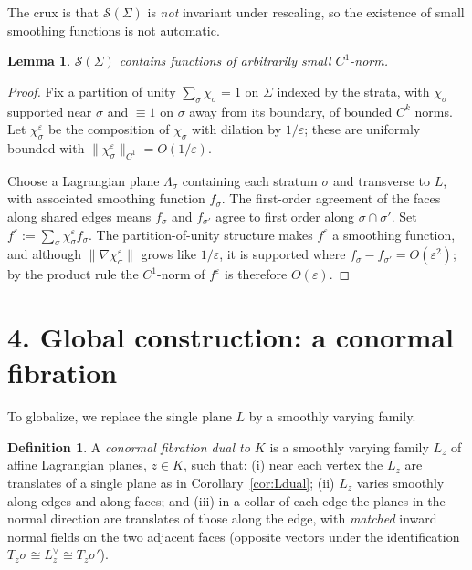 \documentclass[11pt]{article}
\newcommand{\Sm}{\mathscr S}
\newcommand{\Ldual}{L^{\vee}}
\newtheorem{lemma}{Lemma}
\theoremstyle{definition}
\newtheorem{definition}{Definition}
\begin{document}
The crux is that $\Sm(\Sigma)$ is \emph{not} invariant under rescaling, so the
existence of small smoothing functions is not automatic.

\begin{lemma}\label{lem:small}
$\Sm(\Sigma)$ contains functions of arbitrarily small $C^1$-norm.
\end{lemma}

\begin{proof}
Fix a partition of unity $\sum_\sigma \chi_\sigma=1$ on $\Sigma$ indexed by the
strata, with $\chi_\sigma$ supported near $\sigma$ and $\equiv1$ on $\sigma$ away
from its boundary, of bounded $C^k$ norms. Let $\chi_\sigma^\varepsilon$ be the
composition of $\chi_\sigma$ with dilation by $1/\varepsilon$; these are
uniformly bounded with $\|\chi_\sigma^\varepsilon\|_{C^1}=O(1/\varepsilon)$.

Choose a Lagrangian plane $\Lambda_\sigma$ containing each stratum $\sigma$ and
transverse to $L$, with associated smoothing function $f_\sigma$. The first-order
agreement of the faces along shared edges means $f_\sigma$ and $f_{\sigma'}$ agree
to first order along $\sigma\cap\sigma'$. Set $f^\varepsilon:=\sum_\sigma
\chi_\sigma^\varepsilon f_\sigma$. The partition-of-unity structure makes
$f^\varepsilon$ a smoothing function, and although $\|\nabla\chi_\sigma^\varepsilon\|$
grows like $1/\varepsilon$, it is supported where $f_\sigma-f_{\sigma'}=O(\varepsilon^2)$;
by the product rule the $C^1$-norm of $f^\varepsilon$ is therefore $O(\varepsilon)$.
\end{proof}

\section*{4. Global construction: a conormal fibration}

To globalize, we replace the single plane $L$ by a smoothly varying family.

\begin{definition}\label{def:fibration}
A \emph{conormal fibration dual to $K$} is a smoothly varying family $L_z$ of
affine Lagrangian planes, $z\in K$, such that: (i) near each vertex the $L_z$ are
translates of a single plane as in Corollary~\ref{cor:Ldual}; (ii) $L_z$ varies
smoothly along edges and along faces; and (iii) in a collar of each edge the
planes in the normal direction are translates of those along the edge, with
\emph{matched} inward normal fields on the two adjacent faces (opposite vectors
under the identification $T_z\sigma\cong\Ldual_z\cong T_z\sigma'$).
\end{definition}
\end{document}
